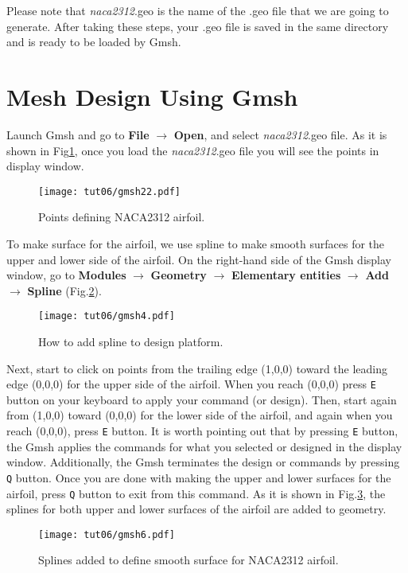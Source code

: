 Please note that \textit{naca2312}.geo is the name of the .geo file that we are going to generate. After taking these steps, your .geo file is saved in the same directory and is ready to be loaded by Gmsh.
\section{Mesh Design Using Gmsh}
Launch Gmsh and go to \textbf{File} $\rightarrow$ \textbf{Open}, and select \textit{naca2312}.geo file. As it is shown in Fig\ref{fig6:gmsh22}, once you load the \textit{naca2312}.geo file you will see the points in display window.
\begin{figure}[htbp]
    \centering
    \texttt{[image: tut06/gmsh22.pdf]}
    \caption{Points defining NACA2312 airfoil.}
    \label{fig6:gmsh22}
\end{figure}
To make surface for the airfoil, we use spline to make smooth surfaces for the upper and lower side of the airfoil. On the right-hand side of the Gmsh display window, go to \textbf{Modules} $\rightarrow$ \textbf{Geometry} $\rightarrow$ \textbf{Elementary entities} $\rightarrow$ \textbf{Add} $\rightarrow$ \textbf{Spline} (Fig.\ref{fig6:gmsh4}).
\begin{figure}[htbp]
    \centering
    \texttt{[image: tut06/gmsh4.pdf]}
    \caption{How to add spline to design platform.}
    \label{fig6:gmsh4}
\end{figure}
Next, start to click on points from the trailing edge (1,0,0) toward the leading edge (0,0,0) for the upper side of the airfoil. When you reach (0,0,0) press \texttt{E} button on your keyboard to apply your command (or design). Then, start again from (1,0,0) toward (0,0,0) for the lower side of the airfoil, and again when you reach (0,0,0), press \texttt{E} button. It is worth pointing out that by pressing \texttt{E} button, the Gmsh applies the commands for what you selected or designed in the display window. Additionally, the Gmsh terminates the design or commands by pressing \texttt{Q} button. Once you are done with making the upper and lower surfaces for the airfoil, press \texttt{Q} button to exit from this command. As it is shown in Fig.\ref{fig6:gmsh6}, the splines for both upper and lower surfaces of the airfoil are added to geometry.
\begin{figure}[htbp]
    \centering
    \texttt{[image: tut06/gmsh6.pdf]}
    \caption{Splines added to define smooth surface for NACA2312 airfoil.}
    \label{fig6:gmsh6}
\end{figure}
